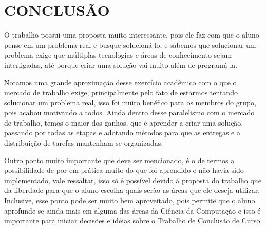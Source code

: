 \chapter{CONCLUSÃO}
\label{chap:conclusao}





O trabalho possui uma proposta muito interessante, pois ele faz com que o aluno pense em um problema real e busque solucioná-lo, e sabemos que solucionar um problema exige que múltiplas tecnologias e áreas de conhecimento sejam interligadas, até porque criar uma solução vai muito além de programá-la.

Notamos uma grande aproximação desse exercício acadêmico com o que o mercado de trabalho exige, principalmente pelo fato de estarmos tentando solucionar um problema real, isso foi muito benéfico para os membros do grupo, pois acabou motivando a todos. Ainda dentro desse paralelismo com o mercado de trabalho, temos o maior dos ganhos, que é aprender a criar uma solução, passando por todas as etapas e adotando métodos para que as entregas e a distribuição de tarefas mantenham-se organizadas.

Outro ponto muito importante que deve ser mencionado, é o de termos a possibilidade de por em prática muito do que foi aprendido e não havia sido implementado, vale ressaltar, isso só é possível devido à proposta do trabalho que da liberdade para que o aluno escolha quais serão as áreas que ele deseja utilizar. Inclusive, esse ponto pode ser muito bem aproveitado, pois permite que o aluno aprofunde-se ainda mais em alguma das áreas da Ciência da Computação e isso é importante para iniciar decisões e idéias sobre o Trabalho de Conclusão de Curso.

